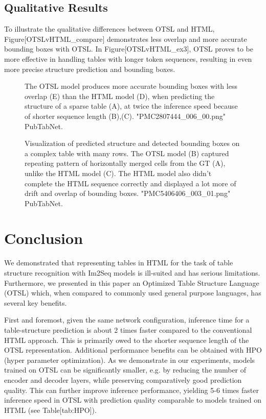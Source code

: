 \documentclass[11pt,a4paper]{article}
\begin{document}
\subsection{Qualitative Results}

To illustrate the qualitative differences between OTSL and HTML, Figure[OTSLvHTML\_compare] demonstrates less overlap and more accurate bounding boxes with OTSL. In Figure[OTSLvHTML\_ex3], OTSL proves to be more effective in handling tables with longer token sequences, resulting in even more precise structure prediction and bounding boxes.

\begin{figure}[h]
\caption{The OTSL model produces more accurate bounding boxes with less overlap (E) than the HTML model (D), when predicting the structure of a sparse table (A), at twice the inference speed because of shorter sequence length (B),(C). "PMC2807444\_006\_00.png" PubTabNet.}
\end{figure}

\begin{figure}[h]
\caption{Visualization of predicted structure and detected bounding boxes on a complex table with many rows. The OTSL model (B) captured repeating pattern of horizontally merged cells from the GT (A), unlike the HTML model (C). The HTML model also didn't complete the HTML sequence correctly and displayed a lot more of drift and overlap of bounding boxes. "PMC5406406\_003\_01.png" PubTabNet.}
\end{figure}

\section{Conclusion}

We demonstrated that representing tables in HTML for the task of table structure recognition with Im2Seq models is ill-suited and has serious limitations. Furthermore, we presented in this paper an Optimized Table Structure Language (OTSL) which, when compared to commonly used general purpose languages, has several key benefits.

First and foremost, given the same network configuration, inference time for a table-structure prediction is about 2 times faster compared to the conventional HTML approach. This is primarily owed to the shorter sequence length of the OTSL representation. Additional performance benefits can be obtained with HPO (hyper parameter optimization). As we demonstrate in our experiments, models trained on OTSL can be significantly smaller, e.g. by reducing the number of encoder and decoder layers, while preserving comparatively good prediction quality. This can further improve inference performance, yielding 5-6 times faster inference speed in OTSL with prediction quality comparable to models trained on HTML (see Table[tab:HPO]).
\end{document}
